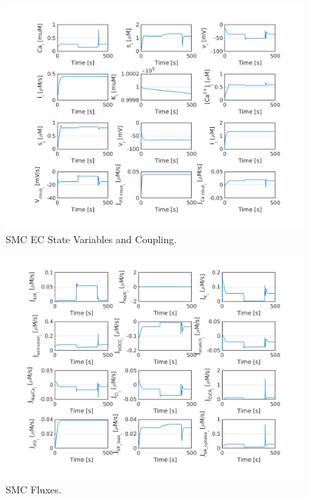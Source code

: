 \begin{landscape}
		
		\begin{figure}[h!]
			\centering
			\includegraphics{new_figures/4 SMC EC State Variables and Coupling.png}
			\caption{SMC EC State Variables and Coupling.}
			\label{fig:4}
		\end{figure}
			
		\begin{figure}[h!]
			\centering
			\includegraphics{new_figures/5 SMC Fluxes.png}
			\caption{SMC Fluxes.}
			\label{fig:5}
		\end{figure}
		

\end{landscape}
